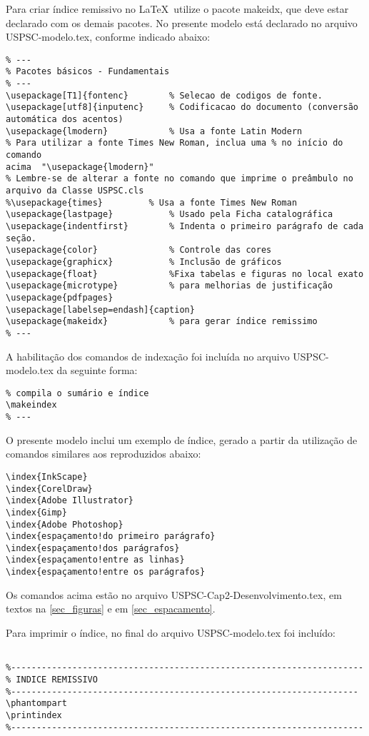 Para criar índice remissivo no \LaTeX\  utilize o pacote makeidx, que deve estar declarado com os demais pacotes. No presente modelo está declarado no arquivo USPSC-modelo.tex, conforme indicado abaixo:

\begin{verbatim}
% ---
% Pacotes básicos - Fundamentais 
% ---
\usepackage[T1]{fontenc}		% Selecao de codigos de fonte.
\usepackage[utf8]{inputenc}		% Codificacao do documento (conversão 
automática dos acentos)
\usepackage{lmodern}			% Usa a fonte Latin Modern
% Para utilizar a fonte Times New Roman, inclua uma % no início do comando 
acima  "\usepackage{lmodern}"
% Lembre-se de alterar a fonte no comando que imprime o preâmbulo no 
arquivo da Classe USPSC.cls
%\usepackage{times}			% Usa a fonte Times New Roman					
\usepackage{lastpage}			% Usado pela Ficha catalográfica
\usepackage{indentfirst}		% Indenta o primeiro parágrafo de cada seção.
\usepackage{color}				% Controle das cores
\usepackage{graphicx}			% Inclusão de gráficos
\usepackage{float} 				%Fixa tabelas e figuras no local exato
\usepackage{microtype} 			% para melhorias de justificação
\usepackage{pdfpages}
\usepackage[labelsep=endash]{caption}
\usepackage{makeidx}            % para gerar índice remissimo
% ---
\end{verbatim}

A habilitação dos comandos de indexação foi incluída no arquivo USPSC-modelo.tex da seguinte forma:


\begin{verbatim}
% compila o sumário e índice
\makeindex
% ---
\end{verbatim}

O presente modelo inclui um exemplo de índice, gerado a partir da utilização de comandos similares aos reproduzidos abaixo:

\begin{verbatim}
\index{InkScape}
\index{CorelDraw}
\index{Adobe Illustrator}
\index{Gimp}
\index{Adobe Photoshop}
\index{espaçamento!do primeiro parágrafo}
\index{espaçamento!dos parágrafos}
\index{espaçamento!entre as linhas}
\index{espaçamento!entre os parágrafos}
\end{verbatim}

Os comandos acima estão no arquivo USPSC-Cap2-Desenvolvimento.tex, em textos na  \autoref{sec_figuras} e em \autoref{sec_espacamento}.

Para imprimir o índice, no final do arquivo USPSC-modelo.tex foi incluído:

\begin{verbatim}

%---------------------------------------------------------------------
% INDICE REMISSIVO
%--------------------------------------------------------------------
\phantompart
\printindex
%---------------------------------------------------------------------
\end{verbatim}

